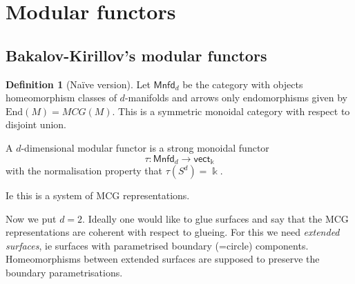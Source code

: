 \documentclass[11pt]{article}
\theoremstyle{definition}
\newtheorem{definition}[theorem]{Definition}
\begin{document}
\section{Modular functors}



\subsection{Bakalov-Kirillov's modular functors}


\begin{definition}[Naïve version]
Let $\mathsf{Mnfd}_d$ be the category with objects homeomorphism classes of $d$-manifolds and arrows only endomorphisms given by $\mathrm{End}(M)=MCG(M).$ This is a symmetric monoidal category with respect to disjoint union.

A $d$-dimensional modular functor is a strong monoidal functor $$\tau: \mathsf{Mnfd}_d \to \mathsf{vect}_\Bbbk$$ with the normalisation property that $\tau (S^d)=\Bbbk$.
\end{definition}



Ie this is a system of MCG representations. 

Now we put $d=2$.  Ideally one would like to glue surfaces and say that the MCG representations are coherent with respect to glueing. For this we need \textit{extended surfaces}, ie surfaces with parametrised boundary (=circle) components. Homeomorphisms between extended surfaces are supposed to preserve the boundary parametrisations.
\end{document}
